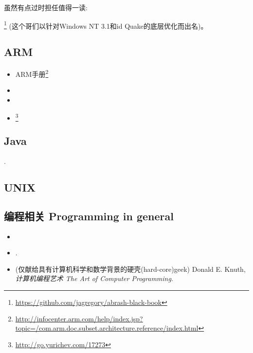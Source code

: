 \documentclass[UTF8,nofonts]{ctexart}
\begin{document}
虽然有点过时担任值得一读:

\MAbrash\footnote{\AlsoAvailableAs \url{https://github.com/jagregory/abrash-black-book}}
(这个哥们以针对Windows NT 3.1和id Quake的底层优化而出名)。

\subsection{ARM}

\begin{itemize}
\item ARM手册\footnote{\AlsoAvailableAs \url{http://infocenter.arm.com/help/index.jsp?topic=/com.arm.doc.subset.architecture.reference/index.html}}

\item \ARMSevenRef

\item \ARMSixFourRefURL

\item \ARMCookBook\footnote{\AlsoAvailableAs \url{http://go.yurichev.com/17273}}
\end{itemize}


\subsection{Java}

\JavaBook.

\subsection{UNIX}

\TAOUP

\subsection{编程相关 Programming in general}

\begin{itemize}

\item \RobPikePractice

\item \HenryWarren.
\item (仅献给具有计算机科学和数学背景的硬壳(hard-core)geek) Donald E. Knuth, \emph{计算机编程艺术 The Art of Computer Programming}.

\end{itemize}


\end{document}
